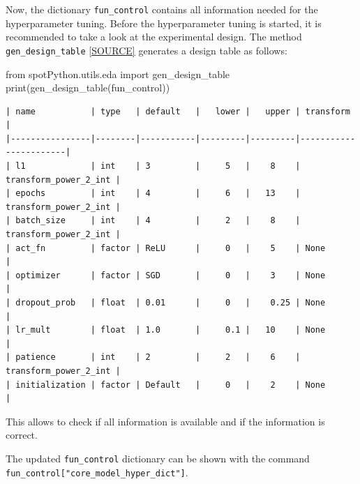 \documentclass[
  letterpaper,
  DIV=11,
  numbers=noendperiod]{scrreprt}
\newenvironment{Shaded}{\begin{snugshade}}{\end{snugshade}}
\newcommand{\BuiltInTok}[1]{\textcolor[rgb]{0.00,0.23,0.31}{#1}}
\newcommand{\ImportTok}[1]{\textcolor[rgb]{0.00,0.46,0.62}{#1}}
\newcommand{\NormalTok}[1]{\textcolor[rgb]{0.00,0.23,0.31}{#1}}
\begin{document}
Now, the dictionary \texttt{fun\_control} contains all information
needed for the hyperparameter tuning. Before the hyperparameter tuning
is started, it is recommended to take a look at the experimental design.
The method \texttt{gen\_design\_table}
\href{https://github.com/sequential-parameter-optimization/spotPython/blob/main/src/spotPython/utils/eda.py}{{[}SOURCE{]}}
generates a design table as follows:

\begin{Shaded}
\begin{Highlighting}[]
\ImportTok{from}\NormalTok{ spotPython.utils.eda }\ImportTok{import}\NormalTok{ gen\_design\_table}
\BuiltInTok{print}\NormalTok{(gen\_design\_table(fun\_control))}
\end{Highlighting}
\end{Shaded}

\begin{verbatim}
| name           | type   | default   |   lower |   upper | transform             |
|----------------|--------|-----------|---------|---------|-----------------------|
| l1             | int    | 3         |     5   |    8    | transform_power_2_int |
| epochs         | int    | 4         |     6   |   13    | transform_power_2_int |
| batch_size     | int    | 4         |     2   |    8    | transform_power_2_int |
| act_fn         | factor | ReLU      |     0   |    5    | None                  |
| optimizer      | factor | SGD       |     0   |    3    | None                  |
| dropout_prob   | float  | 0.01      |     0   |    0.25 | None                  |
| lr_mult        | float  | 1.0       |     0.1 |   10    | None                  |
| patience       | int    | 2         |     2   |    6    | transform_power_2_int |
| initialization | factor | Default   |     0   |    2    | None                  |
\end{verbatim}

This allows to check if all information is available and if the
information is correct.

\begin{tcolorbox}[enhanced jigsaw, left=2mm, title=\textcolor{quarto-callout-note-color}{\faInfo}\hspace{0.5em}{Note: Hyperparameters of the Tuned Model and the \texttt{fun\_control}
Dictionary}, titlerule=0mm, toprule=.15mm, leftrule=.75mm, colbacktitle=quarto-callout-note-color!10!white, colback=white, arc=.35mm, toptitle=1mm, bottomtitle=1mm, colframe=quarto-callout-note-color-frame, bottomrule=.15mm, rightrule=.15mm, breakable, coltitle=black, opacitybacktitle=0.6, opacityback=0]

The updated \texttt{fun\_control} dictionary can be shown with the
command \texttt{fun\_control{[}"core\_model\_hyper\_dict"{]}}.

\end{tcolorbox}
\end{document}
